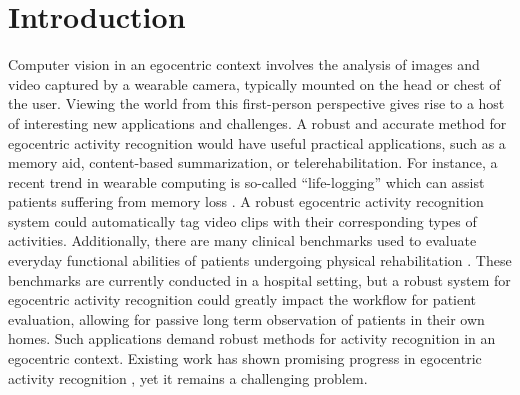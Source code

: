 \documentclass[12pt]{article} %
\begin{document}
\section{Introduction}
  Computer vision in an egocentric context involves the analysis of
  images and video captured by a wearable camera, typically mounted on the
  head or chest of the user. Viewing the world from
  this first-person perspective gives rise to a host of interesting new
  applications and challenges.
	A robust and accurate method for egocentric activity recognition would have 
	useful practical applications, such as a memory aid, content-based
  summarization, or telerehabilitation. For instance,
	a recent trend in wearable computing is so-called ``life-logging'' which can
	assist patients suffering from memory loss \cite{Sellen07}. 
	A robust egocentric activity recognition
	system could automatically tag video clips with their corresponding types of activities.
  Additionally, there are many clinical benchmarks used to evaluate everyday
  functional abilities of patients undergoing physical rehabilitation \cite{Kopp97, Catz97, Itzkovich07}. 
  These benchmarks are currently conducted in a
  hospital setting, but a robust system for egocentric activity
  recognition
  could greatly impact the workflow for patient evaluation, allowing
  for passive long term observation of patients in their own
  homes.
  Such applications demand robust methods for activity recognition in an
  egocentric context.
  Existing work has shown promising progress in egocentric activity
  recognition \cite{Ramanan12, Fathi12},
  yet it remains a challenging problem.
\end{document}
